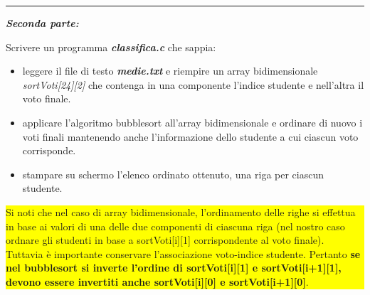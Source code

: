 \documentclass[12pt]{article}
\begin{document}
\vspace{2mm}
\hrule
\vspace{2mm}
\textbf{\emph{Seconda  parte:}}

Scrivere un programma \textbf{\emph{classifica.c}} che sappia: 
\begin{itemize}
\item leggere il file di testo \textbf{\emph{medie.txt}} e riempire un array bidimensionale \emph{sortVoti[24][2]} che contenga in una componente l'indice studente e nell'altra il voto finale. 
\item applicare l'algoritmo bubblesort all'array bidimensionale e ordinare di nuovo i voti finali mantenendo anche l'informazione dello studente a cui ciascun voto corrisponde.
\item stampare su schermo l'elenco ordinato ottenuto, una riga per ciascun studente.

\end{itemize}
\vspace{2mm}


\colorbox{yellow}{\begin{minipage}{17cm}

Si noti che nel caso di array bidimensionale, l'ordinamento delle righe si effettua in base ai valori di una delle due componenti di ciascuna riga (nel nostro caso ordnare gli studenti in base a sortVoti[i][1] corrispondente al voto finale). Tuttavia \`e importante conservare l'associazione voto-indice studente. Pertanto \textbf{se nel bubblesort si inverte l'ordine di sortVoti[i][1] e sortVoti[i+1][1], devono essere invertiti anche sortVoti[i][0] e sortVoti[i+1][0]}.


	    
\end{minipage}}
\end{document}

